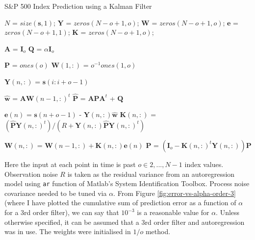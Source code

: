 \documentclass[11pt, fleqn]{article}
\begin{document}
\begin{algorithm}[H]
\caption{S\&P 500 Index Prediction using a Kalman Filter}
\label{alg:kalman}
\begin{algorithmic}


\State {}

\State $N$ = $size(\bm{s}, 1)$; 
\State $\bm{Y}$ = $zeros(N - o + 1, o)$; 
\State $\bm{W}$ = $zeros(N - o + 1, o)$; 
\State $\bm{e}$ = $zeros(N - o + 1, 1)$; 
\State $\bm{K}$ = $zeros(N - o + 1, o)$; 

\State

\State $\bm{A}$ = $\bm{I}_o$ 
\State $\bm{Q}$ = $\alpha\bm{I}_o$ 

\State

\State $\bm{P}$ = $ones(o)$ 
\State $\bm{W}(1,:)$ = $o^{-1}ones(1,o)$

\State


	\State $\bm{Y}(n, :)$ = $\bm{s}(i:i+o-1)$ 

	\State

	\State $\hat{\bm{w}}$ = $\bm{A}\bm{W}(n-1, :)^t$ 
	\State $\hat{\bm{P}}$ = $\bm{A}\bm{P}\bm{A}^t$ + $\bm{Q}$ 

	\State
	
	\State $\bm{e}(n)$ = $\bm{s}(n+o-1)$ - $\bm{Y}(n, :)\hat{\bm{w}}$ 
	\State $\bm{K}(n,:)$ = $(\hat{\bm{P}}\bm{Y}(n, :)^t)/(R + \bm{Y}(n, :)\hat{\bm{P}}\bm{Y}(n, :)^t)$ 

	\State

	\State $\bm{W}(n, :)$ = $\bm{W}(n-1, :) + \bm{K}(n,:)\bm{e}(n)$ 
	\State $\bm{P}$ = $(\bm{I}_o - \bm{K}(n,:)^t\bm{Y}(n, :))\bm{P}$ 

\EndFor

\EndProcedure
\end{algorithmic}
\end{algorithm}

Here the input at each point in time is past $o \in {2, ..., N-1}$ index values. Observation noise $R$ is taken as the residual variance from an autoregression model using \texttt{ar} function of Matlab's System Identification Toolbox. Process noise covariance needed to be tuned via $\alpha$. From Figure \ref{fig:error-vs-alpha-order-3} (where I have plotted the cumulative sum of prediction error as a function of $\alpha$ for a 3rd order filter), we can say that $10^{-3}$ is a reasonable value for $\alpha$. Unless otherwise specified, it can be assumed that a 3rd order filter and autoregression was in use. The weights were initialised in $1/o$ method.\\
\end{document}
